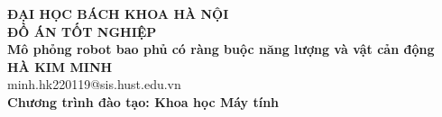 \documentclass[DoAn.tex]{subfiles}
\begin{document}
\begin{titlepage}
\thispagestyle{empty}
\begin{center}

{\textbf{\large{ĐẠI HỌC BÁCH KHOA HÀ NỘI}}}\\[3cm]

{\textbf{\huge{ ĐỒ ÁN TỐT NGHIỆP}}}\\[1cm]
{\textbf{\Large{Mô phỏng robot bao phủ có ràng buộc năng lượng và vật cản động}}}\\[1cm]

{\textbf{\large{HÀ KIM MINH}}}\\
{\large{minh.hk220119@sis.hust.edu.vn}}\\[0.5cm]

{\textbf{\large{Chương trình đào tạo: Khoa học Máy tính
}}}\\

\vspace{2cm}
\begin{table}[H]
\centering
{}
\end{table}
\end{center}



\end{titlepage}
\end{document}
